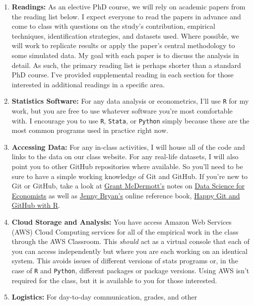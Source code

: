 \documentclass[11pt,]{article}
\begin{document}
\begin{enumerate}
\def\labelenumi{\arabic{enumi}.}
\item
  \textbf{Readings:} As an elective PhD course, we will rely on academic
  papers from the reading list below. I expect everyone to read the
  papers in advance and come to class with questions on the study's
  contribution, empirical techniques, identification strategies, and
  datasets used. Where possible, we will work to replicate results or
  apply the paper's central methodology to some simulated data. My goal
  with each paper is to discuss the analysis in detail. As such, the
  primary reading list is perhaps shorter than a standard PhD course.
  I've provided supplemental reading in each section for those
  interested in additional readings in a specific area.
\item
  \textbf{Statistics Software:} For any data analysis or econometrics,
  I'll use \texttt{R} for my work, but you are free to use whatever
  software you're most comfortable with. I encourage you to use
  \texttt{R}, \texttt{Stata}, or \texttt{Python} simply because these
  are the most common programs used in practice right now.
\item
  \textbf{Accessing Data:} For any in-class activities, I will house all
  of the code and links to the data on our class website. For any
  real-life datasets, I will also point you to other GitHub repositories
  where available. So you'll need to be sure to have a simple working
  knowledge of Git and GitHub. If you're new to Git or GitHub, take a
  look at \href{https://grantmcdermott.com/}{Grant McDermott's} notes on
  \href{https://github.com/uo-ec607/lectures}{Data Science for
  Economists} as well as \href{https://jennybryan.org/}{Jenny Bryan's}
  online reference book, \href{https://happygitwithr.com/}{Happy Git and
  GitHub with R}.
\item
  \textbf{Cloud Storage and Analysis:} You have access Amazon Web
  Services (AWS) Cloud Computing services for all of the empirical work
  in the class through the AWS Classroom. This \emph{should} act as a
  virtual console that each of you can access independently but where
  you are each working on an identical system. This avoids issues of
  different versions of stats programs or, in the case of \texttt{R} and
  \texttt{Python}, different packages or package versions. Using AWS
  isn't required for the class, but it is available to you for those
  interested.
\item
  \textbf{Logistics:} For day-to-day communication, grades, and other

\end{enumerate}
\end{document}
